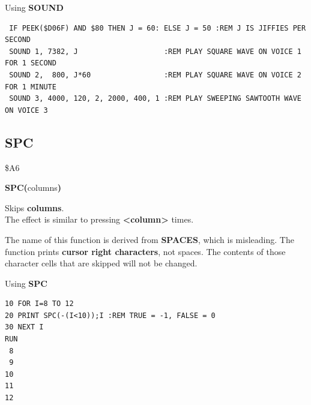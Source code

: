 \begin{description}[leftmargin=2cm,style=nextline]
\item [Examples:] Using {\bf SOUND}
\begin{tcolorbox}[colback=black,coltext=white]
\verbatimfont{\codefont}
\begin{verbatim}
 IF PEEK($D06F) AND $80 THEN J = 60: ELSE J = 50 :REM J IS JIFFIES PER SECOND
 SOUND 1, 7382, J                    :REM PLAY SQUARE WAVE ON VOICE 1 FOR 1 SECOND
 SOUND 2,  800, J*60                 :REM PLAY SQUARE WAVE ON VOICE 2 FOR 1 MINUTE
 SOUND 3, 4000, 120, 2, 2000, 400, 1 :REM PLAY SWEEPING SAWTOOTH WAVE ON VOICE 3
\end{verbatim}
\end{tcolorbox}
\end{description}



\newpage
\subsection{SPC}
\begin{description}[leftmargin=2cm,style=nextline]
\item [Token:] \$A6
\item [Format:] {\bf SPC(}columns{\bf)}
\item [Usage:] Skips {\bf columns}. \\
               The effect is similar to pressing \megakey{$\rightarrow$}
               {\bf <column>} times.

\item [Remarks:] The name of this function is derived from
                 {\bf SPACES}, which is misleading.
                 The function prints {\bf cursor right characters},
                 not spaces. The contents of those character
                 cells that are skipped will not be changed.

\item [Example:] Using {\bf SPC}
\begin{tcolorbox}[colback=black,coltext=white]
\verbatimfont{\codefont}
\begin{verbatim}
10 FOR I=8 TO 12
20 PRINT SPC(-(I<10));I :REM TRUE = -1, FALSE = 0
30 NEXT I
RUN
 8
 9
10
11
12
\end{verbatim}
\end{tcolorbox}
\end{description}


\newpage
